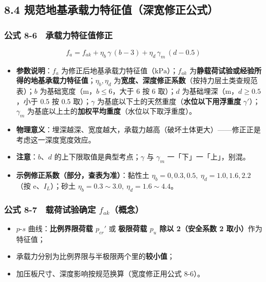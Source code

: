 \documentclass[
]{article}
\providecommand{\tightlist}{%
  \setlength{\itemsep}{0pt}\setlength{\parskip}{0pt}}
\begin{document}
\subsection{8.4
规范地基承载力特征值（深宽修正公式）}\label{ux89c4ux8303ux5730ux57faux627fux8f7dux529bux7279ux5f81ux503cux6df1ux5bbdux4feeux6b63ux516cux5f0f}

\subsubsection{公式
8-6　承载力特征值修正}\label{ux516cux5f0f-8-6-ux627fux8f7dux529bux7279ux5f81ux503cux4feeux6b63}

\[\boxed{f_a=f_{ak}+\eta_b\,\gamma\,(b-3)+\eta_d\,\gamma_m\,(d-0.5)}\]

\begin{itemize}
\tightlist
\item
  \textbf{参数说明}：\(f_a\)
  为修正后地基承载力特征值（\(\mathrm{kPa}\)）；\(f_{ak}\)
  为\textbf{静载荷试验或经验所得的地基承载力特征值}；\(\eta_b,\eta_d\)
  为\textbf{宽度、深度修正系数}（按持力层土类查规范表）；\(b\)
  为基础宽度（m，\textbf{\(b\le6\)}，大于 6 按 6 取）；\(d\)
  为基础埋深（m，\textbf{\(d\ge0.5\)}，小于 0.5 按 0.5 取）；\(\gamma\)
  为基底以下土的天然重度（\textbf{水位以下用浮重度}
  \(\gamma'\)）；\(\gamma_m\)
  为基底以上土的\textbf{加权平均重度}（水位以下取浮重度）。
\item
  \textbf{物理意义}：埋深越深、宽度越大，承载力越高（破坏土体更大）------修正正是考虑这一深度宽度效应。
\item
  \textbf{注意}：\(b\)、\(d\) 的上下限取值是典型考点；\(\gamma\) 与
  \(\gamma_m\) 一「下」一「上」，别混。
\item
  \textbf{示例修正系数（部分，查表为准）}：黏性土
  \(\eta_b=0,0.3,0.5,\ \eta_d=1.0,1.6,2.2\)（按 e、\(I_L\)）；砂土
  \(\eta_b=0.3\sim3.0,\ \eta_d=1.6\sim4.4\)。
\end{itemize}

\subsubsection{\texorpdfstring{公式 8-7　载荷试验确定
\(f_{ak}\)（概念）}{公式 8-7　载荷试验确定 f\_\{ak\}（概念）}}\label{ux516cux5f0f-8-7-ux8f7dux8377ux8bd5ux9a8cux786eux5b9a-f_akux6982ux5ff5}

\begin{itemize}
\tightlist
\item
  \(p\)-\(s\) 曲线：\textbf{比例界限荷载 \(p_{cr}'\)} 或
  \textbf{极限荷载 \(p_u\) 除以 2（安全系数 2 取小）}作为特征值；
\item
  承载力分别为比例界限与半极限两个里的\textbf{较小值}；
\item
  加压板尺寸、深度影响按规范换算（宽度修正用公式 8-6）。
\end{itemize}
\end{document}

